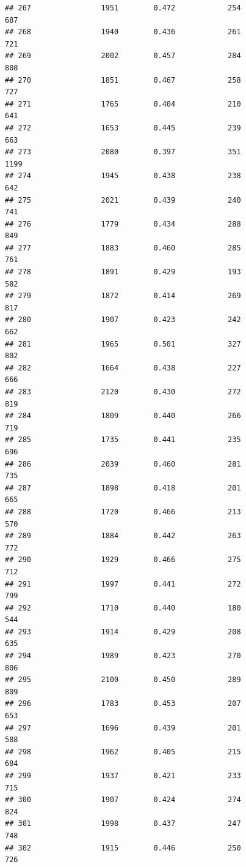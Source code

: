 \documentclass[]{book}
\begin{document}
\begin{verbatim}
## 267                1951        0.472            254                687
## 268                1940        0.436            261                721
## 269                2002        0.457            284                808
## 270                1851        0.467            258                727
## 271                1765        0.404            210                641
## 272                1653        0.445            239                663
## 273                2080        0.397            351               1199
## 274                1945        0.438            238                642
## 275                2021        0.439            240                741
## 276                1779        0.434            288                849
## 277                1883        0.460            285                761
## 278                1891        0.429            193                582
## 279                1872        0.414            269                817
## 280                1907        0.423            242                662
## 281                1965        0.501            327                802
## 282                1664        0.438            227                666
## 283                2120        0.430            272                819
## 284                1809        0.440            266                719
## 285                1735        0.441            235                696
## 286                2039        0.460            281                735
## 287                1898        0.418            201                665
## 288                1720        0.466            213                570
## 289                1884        0.442            263                772
## 290                1929        0.466            275                712
## 291                1997        0.441            272                799
## 292                1710        0.440            180                544
## 293                1914        0.429            208                635
## 294                1989        0.423            270                806
## 295                2100        0.450            289                809
## 296                1783        0.453            207                653
## 297                1696        0.439            201                588
## 298                1962        0.405            215                684
## 299                1937        0.421            233                715
## 300                1907        0.424            274                824
## 301                1998        0.437            247                748
## 302                1915        0.446            250                726

\end{verbatim}
\end{document}
